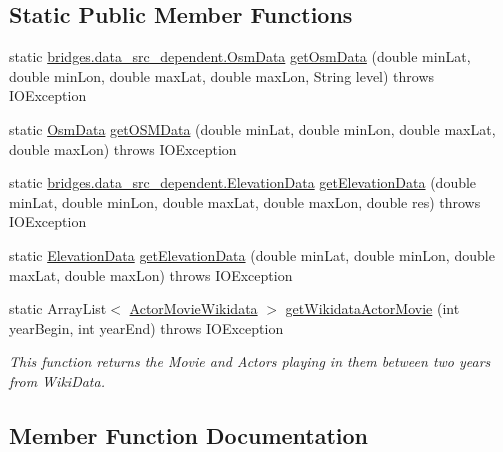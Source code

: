 \subsection*{Static Public Member Functions}
\begin{DoxyCompactItemize}
\item 
static \hyperlink{classbridges_1_1data__src__dependent_1_1_osm_data}{bridges.\+data\+\_\+src\+\_\+dependent.\+Osm\+Data} \hyperlink{classbridges_1_1connect_1_1_data_source_a02158c0c41908db27fc4200bd9c096f4}{get\+Osm\+Data} (double min\+Lat, double min\+Lon, double max\+Lat, double max\+Lon, String level)  throws I\+O\+Exception 
\item 
static \hyperlink{classbridges_1_1data__src__dependent_1_1_osm_data}{Osm\+Data} \hyperlink{classbridges_1_1connect_1_1_data_source_a990d66ef06d1d771f86593a0a1b6e361}{get\+O\+S\+M\+Data} (double min\+Lat, double min\+Lon, double max\+Lat, double max\+Lon)  throws I\+O\+Exception 
\item 
static \hyperlink{classbridges_1_1data__src__dependent_1_1_elevation_data}{bridges.\+data\+\_\+src\+\_\+dependent.\+Elevation\+Data} \hyperlink{classbridges_1_1connect_1_1_data_source_aab78496487313576c6aec52cd43cf518}{get\+Elevation\+Data} (double min\+Lat, double min\+Lon, double max\+Lat, double max\+Lon, double res)  throws I\+O\+Exception 
\item 
static \hyperlink{classbridges_1_1data__src__dependent_1_1_elevation_data}{Elevation\+Data} \hyperlink{classbridges_1_1connect_1_1_data_source_a2943c758a37f115035218a11e6272cb0}{get\+Elevation\+Data} (double min\+Lat, double min\+Lon, double max\+Lat, double max\+Lon)  throws I\+O\+Exception 
\item 
static Array\+List$<$ \hyperlink{classbridges_1_1data__src__dependent_1_1_actor_movie_wikidata}{Actor\+Movie\+Wikidata} $>$ \hyperlink{classbridges_1_1connect_1_1_data_source_ad06946cc793bb990eeb3b9418ade1479}{get\+Wikidata\+Actor\+Movie} (int year\+Begin, int year\+End)  throws I\+O\+Exception 
\begin{DoxyCompactList}\small\item\em This function returns the Movie and Actors playing in them between two years from Wiki\+Data. \end{DoxyCompactList}\end{DoxyCompactItemize}


\subsection{Member Function Documentation}
\mbox{\label{classbridges_1_1connect_1_1_data_source_aaaef8df40e95d5370a7f172c301d2d9f}} 
